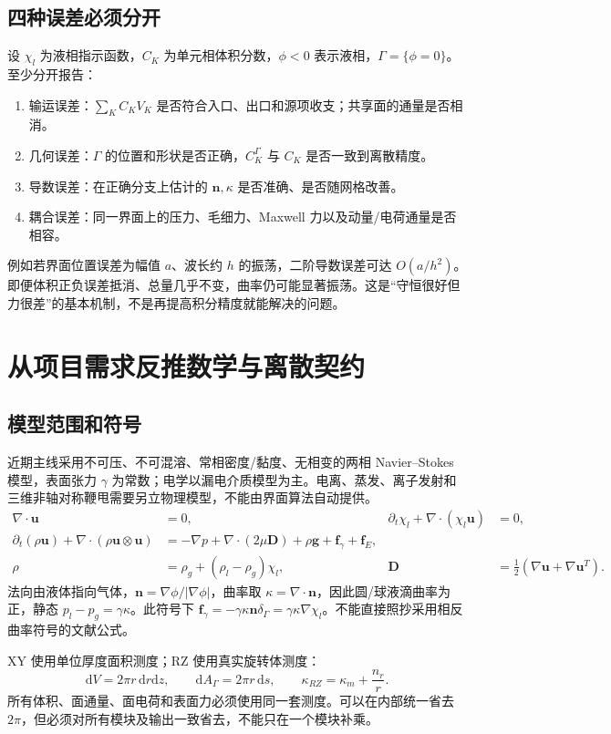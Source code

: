 \documentclass[11pt,a4paper]{article}
\newcommand{\dd}{\mathrm{d}}
\newcommand{\vct}[1]{\boldsymbol{#1}}
\begin{document}
\subsection{四种误差必须分开}
设 $\chi_l$ 为液相指示函数，$C_K$ 为单元相体积分数，$\phi<0$ 表示液相，$\Gamma=\{\phi=0\}$。至少分开报告：
\begin{enumerate}
\item 输运误差：$\sum_K C_KV_K$ 是否符合入口、出口和源项收支；共享面的通量是否相消。
\item 几何误差：$\Gamma$ 的位置和形状是否正确，$C_K^\Gamma$ 与 $C_K$ 是否一致到离散精度。
\item 导数误差：在正确分支上估计的 $\vct n,\kappa$ 是否准确、是否随网格改善。
\item 耦合误差：同一界面上的压力、毛细力、Maxwell 力以及动量/电荷通量是否相容。
\end{enumerate}
例如若界面位置误差为幅值 $a$、波长约 $h$ 的振荡，二阶导数误差可达 $O(a/h^2)$。即便体积正负误差抵消、总量几乎不变，曲率仍可能显著振荡。这是“守恒很好但力很差”的基本机制，不是再提高积分精度就能解决的问题。

\section{从项目需求反推数学与离散契约}
\subsection{模型范围和符号}
近期主线采用不可压、不可混溶、常相密度/黏度、无相变的两相 Navier--Stokes 模型，表面张力 $\gamma$ 为常数；电学以漏电介质模型为主。电离、蒸发、离子发射和三维非轴对称鞭甩需要另立物理模型，不能由界面算法自动提供。
\begin{align}
 \nabla\cdot\vct u&=0, &
 \partial_t\chi_l+\nabla\cdot(\chi_l\vct u)&=0,\label{eq:phase}\\
 \partial_t(\rho\vct u)+\nabla\cdot(\rho\vct u\otimes\vct u)
 &=-\nabla p+\nabla\cdot(2\mu\vct D)+\rho\vct g+\vct f_\gamma+\vct f_E,\label{eq:momentum}\\
 \rho&=\rho_g+(\rho_l-\rho_g)\chi_l, &
 \vct D&=\tfrac12(\nabla\vct u+\nabla\vct u^T).
\end{align}
法向由液体指向气体，$\vct n=\nabla\phi/|\nabla\phi|$，曲率取 $\kappa=\nabla\cdot\vct n$，因此圆/球液滴曲率为正，静态 $p_l-p_g=\gamma\kappa$。此符号下 $\vct f_\gamma=-\gamma\kappa\vct n\delta_\Gamma=\gamma\kappa\nabla\chi_l$。不能直接照抄采用相反曲率符号的文献公式。

XY 使用单位厚度面积测度；RZ 使用真实旋转体测度：
\begin{equation}
 \dd V=2\pi r\,\dd r\dd z,\qquad
 \dd A_\Gamma=2\pi r\,\dd s,\qquad
 \kappa_{RZ}=\kappa_m+\frac{n_r}{r}.
\end{equation}
所有体积、面通量、面电荷和表面力必须使用同一套测度。可以在内部统一省去 $2\pi$，但必须对所有模块及输出一致省去，不能只在一个模块补乘。
\end{document}
